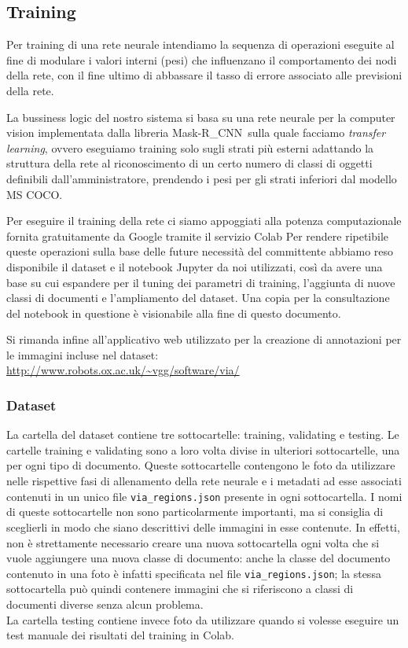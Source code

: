 \documentclass[12pt,a4paper]{article}
\newcommand{\mrcnn}{Mask-R\_CNN}
\begin{document}
\subsection{Training}
\label{s:training}

Per training di una rete neurale intendiamo la sequenza di operazioni
eseguite al fine di modulare i valori interni (pesi) che influenzano il
comportamento dei nodi della rete, con il fine ultimo di abbassare il
tasso di errore associato alle previsioni della rete.

La bussiness logic del nostro sistema si basa su una rete neurale per la
computer vision implementata dalla libreria \mrcnn\ sulla quale facciamo
\textit{transfer learning}, ovvero eseguiamo training solo sugli strati
più esterni adattando la struttura della rete al riconoscimento di un
certo numero di classi di oggetti definibili dall'amministratore,
prendendo i pesi per gli strati inferiori dal modello MS COCO.

Per eseguire il training della rete ci siamo appoggiati alla potenza
computazionale fornita gratuitamente da Google tramite il servizio Colab
Per rendere ripetibile queste operazioni sulla base delle future
necessità del committente abbiamo reso disponibile il dataset e il
notebook Jupyter da noi utilizzati, così da avere una base su cui
espandere per il tuning dei parametri di training, l'aggiunta di nuove
classi di documenti e l'ampliamento del dataset. Una copia per la
consultazione del notebook in questione è visionabile alla fine di
questo documento.

Si rimanda infine all'applicativo web utilizzato per la
creazione di annotazioni per le immagini incluse nel dataset:\\
\url{http://www.robots.ox.ac.uk/~vgg/software/via/}

\subsubsection{Dataset}

La cartella del dataset contiene tre sottocartelle: training, validating
e testing. Le cartelle training e validating sono a loro volta divise in
ulteriori sottocartelle, una per ogni tipo di documento. Queste
sottocartelle contengono le foto da utilizzare nelle rispettive fasi di
allenamento della rete neurale e i metadati ad esse associati contenuti
in un unico file \texttt{via\_regions.json} presente in ogni
sottocartella. I nomi di queste sottocartelle non sono particolarmente
importanti, ma si consiglia di sceglierli in modo che siano descrittivi
delle immagini in esse contenute. In effetti, non è strettamente
necessario creare una nuova sottocartella ogni volta che si vuole
aggiungere una nuova classe di documento: anche la classe del documento
contenuto in una foto è infatti specificata nel file
\texttt{via\_regions.json}; la stessa sottocartella può quindi contenere
immagini che si riferiscono a classi di documenti diverse senza alcun
problema.\\ La cartella testing contiene invece foto da utilizzare
quando si volesse eseguire un test manuale dei risultati del training in
Colab.
\end{document}
